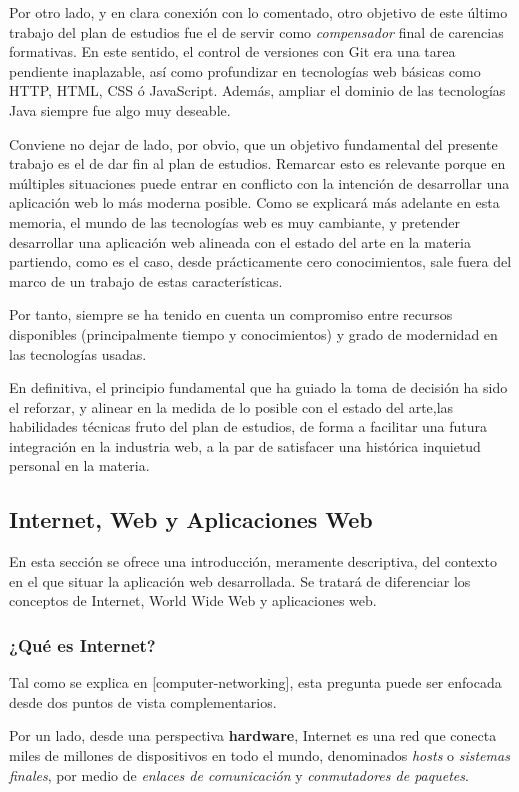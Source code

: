 \documentclass[a4paper]{report}
\begin{document}
    Por otro lado, y en clara conexión con lo comentado, otro objetivo de este último trabajo del plan de estudios fue el de servir como \emph{compensador} final de carencias formativas.
    En este sentido, el control de versiones con Git era una tarea pendiente inaplazable, así como profundizar en tecnologías web básicas como HTTP, HTML, CSS ó JavaScript.
    Además, ampliar el dominio de las tecnologías Java siempre fue algo muy deseable.

    Conviene no dejar de lado, por obvio, que un objetivo fundamental del presente trabajo es el de dar fin al plan de estudios.
    Remarcar esto es relevante porque en múltiples situaciones puede entrar en conflicto con la intención de desarrollar una aplicación web lo más moderna posible.
    Como se explicará más adelante en esta memoria, el mundo de las tecnologías web es muy cambiante,
    y pretender desarrollar una aplicación web alineada con el estado del arte en la materia partiendo, como es el caso, desde prácticamente cero conocimientos,
    sale fuera del marco de un trabajo de estas características.

    Por tanto, siempre se ha tenido en cuenta un compromiso entre recursos disponibles (principalmente tiempo y conocimientos) y grado de modernidad en las tecnologías usadas.

    En definitiva, el principio fundamental que ha guiado la toma de decisión ha sido el reforzar, y alinear en la medida de lo posible con el estado del arte,las habilidades técnicas fruto del plan de estudios, de forma a facilitar una futura integración en la industria web,
    a la par de satisfacer una histórica inquietud personal en la materia.


    \subsection{Internet, Web y Aplicaciones Web}
    En esta sección se ofrece una introducción, meramente descriptiva, del contexto en el que situar la aplicación web desarrollada. Se tratará de diferenciar los conceptos de Internet, World Wide Web y aplicaciones web.

    \subsubsection{¿Qué es Internet?}
    Tal como se explica en [computer-networking], esta pregunta puede ser enfocada desde dos puntos de vista complementarios.

    Por un lado, desde una perspectiva \textbf{hardware}, Internet es una red que conecta miles de millones de dispositivos en todo el mundo,
    denominados \emph{hosts} o \emph{sistemas finales}, por medio de \emph{enlaces de comunicación} y \emph{conmutadores de paquetes}.
    
\end{document}
